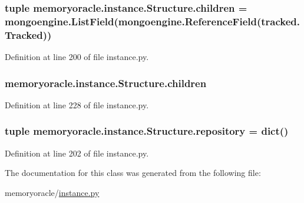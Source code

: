\subsubsection[{children}]{\setlength{\rightskip}{0pt plus 5cm}tuple memoryoracle.\+instance.\+Structure.\+children = mongoengine.\+List\+Field(mongoengine.\+Reference\+Field({\bf tracked.\+Tracked}))\hspace{0.3cm}{\ttfamily [static]}}\label{classmemoryoracle_1_1instance_1_1Structure_a5a8dcad9bb85bbde2676e9b6e9fa138e}


Definition at line 200 of file instance.\+py.

\hypertarget{classmemoryoracle_1_1instance_1_1Structure_ac9da48acb0aae1763cc98f5b3ab8fee3}{}
\subsubsection[{children}]{\setlength{\rightskip}{0pt plus 5cm}memoryoracle.\+instance.\+Structure.\+children}\label{classmemoryoracle_1_1instance_1_1Structure_ac9da48acb0aae1763cc98f5b3ab8fee3}


Definition at line 228 of file instance.\+py.

\hypertarget{classmemoryoracle_1_1instance_1_1Structure_a1c9e520113c49be36a1bc9f57b6deee4}{}
\subsubsection[{repository}]{\setlength{\rightskip}{0pt plus 5cm}tuple memoryoracle.\+instance.\+Structure.\+repository = dict()\hspace{0.3cm}{\ttfamily [static]}}\label{classmemoryoracle_1_1instance_1_1Structure_a1c9e520113c49be36a1bc9f57b6deee4}


Definition at line 202 of file instance.\+py.



The documentation for this class was generated from the following file\+:\begin{DoxyCompactItemize}
\item 
memoryoracle/\hyperlink{instance_8py}{instance.\+py}\end{DoxyCompactItemize}
